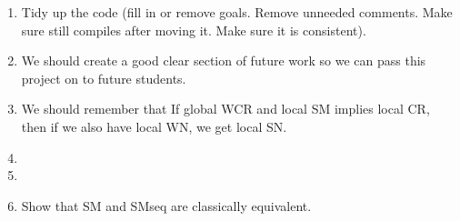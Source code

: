 \documentclass{scrartcl}
\begin{document}
\begin{enumerate}
    \item Tidy up the code (fill in or remove goals. Remove unneeded comments. Make sure still compiles after moving it. Make sure it is consistent).
    \item We should create a good clear section of future work so we can pass this project on to future students.
    \item {We should remember that If global WCR and local SM implies local CR, then if we also have local WN, we get local SN.}
    \item {}
    \item {}
    \item Show that SM and SMseq are classically equivalent.
\end{enumerate}
\end{document}
